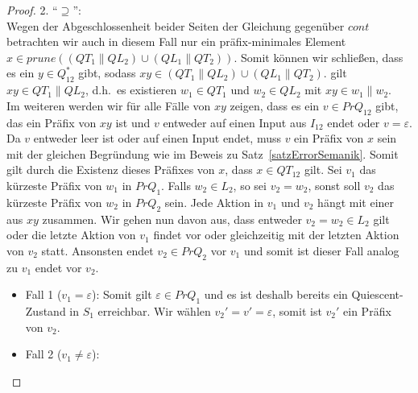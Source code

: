 \begin{proof}
  2. ``$\supseteq$'':\\
  Wegen der Abgeschlossenheit beider Seiten der Gleichung gegenüber $cont$
  betrachten wir auch in diesem Fall nur ein präfix-minimales Element$x\in
  prune((QT_1\|QL_2)\cup (QL_1\|QT_2))$. Somit können wir schließen, dass es
  ein $y\in Q_{12}^*$ gibt, sodass $xy\in (QT_1\|QL_2)\cup (QL_1\|QT_2)$. \OBdA
  gilt $xy\in QT_1\|QL_2$, d.h.\ es existieren $w_1\in QT_1$ und $w_2\in QL_2$
  mit $xy\in w_1\| w_2$.\\
  Im weiteren werden wir für alle Fälle von $xy$ zeigen, dass es ein $v\in
  PrQ_{12}$ gibt, das ein Präfix von $xy$ ist und $v$ entweder auf einen Input
  aus $I_{12}$ endet oder $v=\varepsilon$. Da $v$ entweder leer ist oder auf
  einen Input endet, muss $v$ ein Präfix von $x$ sein mit der gleichen
  Begründung wie im Beweis zu Satz~\ref{satzErrorSemanik}. Somit gilt durch die
  Existenz dieses Präfixes von $x$, dass $x\in QT_{12}$ gilt. Sei $v_1$ das
  kürzeste Präfix von $w_1$ in $PrQ_1$. Falls $w_2\in L_2$, so sei $v_2=w_2$,
  sonst soll $v_2$ das kürzeste Präfix von $w_2$ in $PrQ_2$ sein. Jede Aktion
  in $v_1$ und $v_2$ hängt mit einer aus $xy$ zusammen. Wir gehen nun davon
  aus, dass entweder $v_2=w_2\in L_2$ gilt oder die letzte Aktion von $v_1$
  findet vor oder gleichzeitig mit der letzten Aktion von $v_2$ statt.
  Ansonsten endet $v_2\in PrQ_2$ vor $v_1$ und somit ist dieser Fall analog zu
  $v_1$ endet vor $v_2$.
  \begin{itemize}
    \item Fall 1 ($v_1=\varepsilon$): Somit gilt $\varepsilon\in PrQ_1$ und es
      ist deshalb bereits ein Quiescent-Zustand in $S_1$ erreichbar. Wir wählen
      $v_2'=v'=\varepsilon$, somit ist $v_2'$ ein Präfix von $v_2$.
    \item Fall 2 ($v_1\neq \varepsilon$):
  \end{itemize}


\end{proof}
